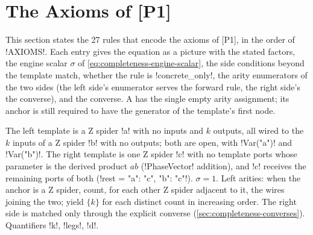 \section{The Axioms of [P1]}\label{sec:completeness-p1}

This section states the 27 rules that encode the axioms of [P1], in the order of
\py!AXIOMS!. Each entry gives the equation as a picture with the stated factors, the engine scalar
$\sigma$ of \cref{eq:completeness-engine-scalar}, the side conditions beyond the template match,
whether the rule is \py!concrete_only!, the arity enumerators of the two sides (the left side's
enumerator serves the forward rule, the right side's the converse), and the converse. A
 has the single empty arity assignment; its anchor is still required to have the
generator of the template's first node.

The left template is a Z spider \code!a! with no inputs and $k$ outputs, all wired to the $k$
inputs of a Z spider \code!b! with no outputs; both are open, with \py!Var("a")! and
\py!Var("b")!. The right template is one Z spider \code!c! with no template ports whose parameter
is the derived product $ab$ (\py!PhaseVector! addition), and \code!c! receives the remaining
ports of both (\py!rest = {"a": "c", "b": "c"}!). $\sigma=1$. Left arities: when the anchor is a
Z spider, count, for each other Z spider adjacent to it, the wires joining the two; yield
$\{k\}$ for each distinct count in increasing order. The right side is matched only through the
explicit converse  (\cref{sec:completeness-converses}). Quantifiers
\code!k!, \code!legs!, \code!d!.

